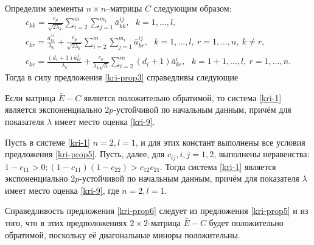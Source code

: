         Определим элементы
$n\times n$--матрицы $C$ следующим образом:
$$
\begin{array}{crl}
c_{kk}  = \frac{c_p}{\sqrt{2\lambda_k }}\sum
\limits_{i=2}^m \sum \limits_{j=1}^{m_i}\bar a^{ij}_{kk}, \ \ \ k = 1,...,l,\\
c_{kr} = \frac{\bar a^{11}_{kr}}{\lambda _k }+
\frac{c_p}{\sqrt{2\lambda_k }}\sum \limits_{i=2}^m \sum
\limits_{j=1}^{m_i}\bar a^{ij}_{kr}, \ \ \ k =
1,...,l, \ r = 1, ..., n, \ k \neq r,\\
c_{kr} = \frac{(d_1+1)\bar a^{1}_{kr}}{\lambda_k} +
\frac{c_p}{\lambda_k\sqrt{h}} \sum \limits _{i=2}^{m}\mathrel (d_i +
1)\bar a^{i}_{kr}, \ \ \ k = 1 + 1,...,l,\ r = 1,...,n.
\end {array}
$$
Тогда в силу предложения \ref{kri-prop3} справедливы следующие

\begin{proposition}\label{kri-prop5}  Если матрица $\bar E - C$ является
положительно обратимой, то система \eqref{kri-1} является экспоненциально
${2p}$-устойчивой по начальным данным, причём для показателя
$\lambda$ имеет место оценка \eqref{kri-9}.
\end{proposition}

\begin{proposition}\label{kri-prop6} Пусть в системе \eqref{kri-1} $n = 2, l =1$, и
для этих констант выполнены все условия предложения \ref{kri-prop5}. Пусть, далее,
для $c_{ij}, i,j = 1, 2$, выполнены неравенства: $ 1 - c_{11}
> 0; (1 - c_{11})(1 - c_{22}) > c_{12}c_{21}$. Тогда система \eqref{kri-1}
является экспоненциально ${2p}$-устойчивой по начальным данным,
причём для показателя  $\lambda$ имеет место оценка \eqref{kri-9}, где $n = 2,
l =1$.
\end{proposition}

Справедливость предложения \ref{kri-prop6} следует из предложения \ref{kri-prop5} и из того, что в этих предположениях $2\times 2$-матрица $\bar E - C$ будет
положительно обратимой, поскольку её диагональные миноры положительны.


